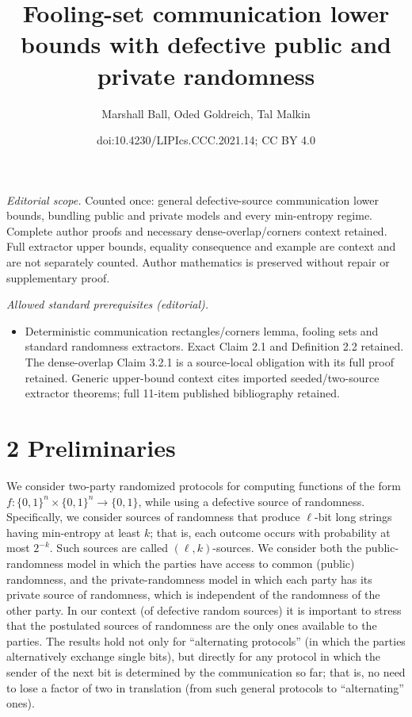 \documentclass[10pt,a4paper]{article}
\title{Fooling-set communication lower bounds with defective public and private randomness}
\author{Marshall Ball, Oded Goldreich, Tal Malkin}
\date{doi:10.4230/LIPIcs.CCC.2021.14; CC BY 4.0}
\begin{document}
\maketitle
\noindent\textit{Editorial scope.} Counted once: general defective-source communication lower bounds, bundling public and private models and every min-entropy regime. Complete author proofs and necessary dense-overlap/corners context retained. Full extractor upper bounds, equality consequence and example are context and are not separately counted. Author mathematics is preserved without repair or supplementary proof.\par\medskip
\noindent\textit{Allowed standard prerequisites (editorial).}\begin{itemize}
\item Deterministic communication rectangles/corners lemma, fooling sets and standard randomness extractors. Exact Claim 2.1 and Definition 2.2 retained. The dense-overlap Claim 3.2.1 is a source-local obligation with its full proof retained. Generic upper-bound context cites imported seeded/two-source extractor theorems; full 11-item published bibliography retained.
\end{itemize}\medskip
\section*{2 Preliminaries}
We consider two-party randomized protocols for computing functions of the form $f:\{0,1\}^n\times\{0,1\}^n\to\{0,1\}$, while using a defective source of randomness. Specifically, we consider sources of randomness that produce $\ell$-bit long strings having min-entropy at least $k$; that is, each outcome occurs with probability at most $2^{-k}$. Such sources are called $(\ell,k)$-sources.
We consider both the public-randomness model in which the parties have access to common (public) randomness, and the private-randomness model in which each party has its private source of randomness, which is independent of the randomness of the other party. In our context (of defective random sources) it is important to stress that the postulated sources of randomness are the only ones available to the parties.
The results hold not only for ``alternating protocols'' (in which the parties alternatively exchange single bits), but directly for any protocol in which the sender of the next bit is determined by the communication so far; that is, no need to lose a factor of two in translation (from such general protocols to ``alternating'' ones).
\end{document}
